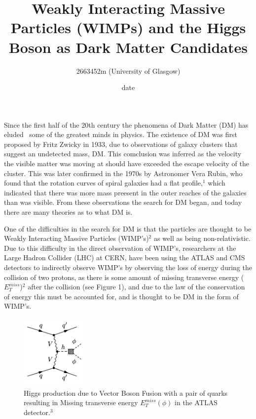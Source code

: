 \documentclass[]{article}
\title{\vspace{-8em}
\textbf{Weakly Interacting Massive Particles (WIMPs) 
and the Higgs Boson as Dark Matter Candidates }}
\author{2663452m (University of Glasgow)}
\date{date}
\begin{document}
\maketitle
Since the first half of the 20th century the phenomena of Dark Matter (DM) has eluded \
some of the greatest minds in physics. The existence of DM was first 
proposed by Fritz Zwicky in 1933, due to observations of galaxy clusters that suggest
an undetected mass, DM. This comclusion was inferred as the velocity the visible matter was
moving at should have exceeded the escape velocity of the cluster. 
This was later confirmed in the 1970s by Astronomer Vera Rubin, who found that
the rotation curves of spiral galaxies had a flat profile,$^1$ which indicated 
that there was more mass preesent in the outer reaches of the galaxies than 
was visible. From these observations the search for DM began, and today 
there are many theories as to what DM is.
\par


One of the difficulties in the search for DM is that the particles are thought 
to be Weakly Interacting Massive Particles (WIMP's)$^2$ as well as being non-relativistic.
Due to this difficulty in the direct observation of WIMP's, researchers
at the Large Hadron Collider (LHC) at CERN, have been using the ATLAS and CMS 
detectors to indirectly observe WIMP's by observing the loss of energy during the 
collision of two protons, as there is some amount of missing transverse energy ($E^{miss}_{T} $)$^2$
after the collision (see Figure 1), and due to the law of the conservation of energy
this must be accounted for, and is thought to be DM in the form of WIMP's. 



\begin{figure}[h]
\centering  
\includegraphics[width=0.3\textwidth]{images/Feynman Diagrams of missing Tranverse energy.png}
\caption{Higgs production due to Vector Boson Fusion with a pair of quarks resulting in Missing transverse energy $E^{miss}_{T} (\phi)$ in the ATLAS detector.$^3$}
\label{fig:missing_energy}
\end{figure}
\end{document}
